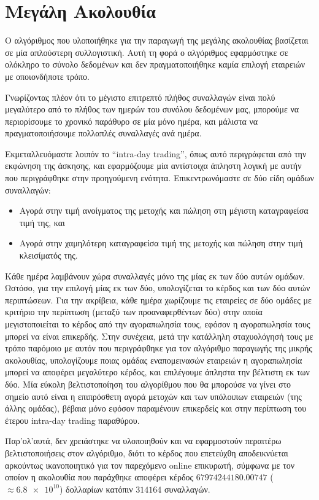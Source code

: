 \section{Μεγάλη Ακολουθία}

Ο αλγόριθμος που υλοποιήθηκε για την παραγωγή της μεγάλης ακολουθίας βασίζεται σε μία απλούστερη συλλογιστική.
Αυτή τη φορά ο αλγόριθμος εφαρμόστηκε σε ολόκληρο το σύνολο δεδομένων και δεν πραγματοποιήθηκε καμία επιλογή εταιρειών με οποιονδήποτε τρόπο.

Γνωρίζοντας πλέον ότι το μέγιστο επιτρεπτό πλήθος συναλλαγών είναι πολύ μεγαλύτερο από το πλήθος των ημερών του συνόλου δεδομένων μας, μπορούμε να περιορίσουμε το χρονικό παράθυρο σε μία μόνο ημέρα, και μάλιστα να πραγματοποιήσουμε πολλαπλές συναλλαγές ανά ημέρα.

Εκμεταλλευόμαστε λοιπόν το ``intra-day trading'', όπως αυτό περιγράφεται από την εκφώνηση της άσκησης, και εφαρμόζουμε μία αντίστοιχα άπληστη λογική με αυτήν που περιγράφθηκε στην προηγούμενη ενότητα.
Επικεντρωνόμαστε σε δύο είδη ομάδων συναλλαγών:
\begin{itemize}
    \item Αγορά στην τιμή ανοίγματος της μετοχής και πώληση στη μέγιστη καταγραφείσα τιμή της, και
    \item Αγορά στην χαμηλότερη καταγραφείσα τιμή της μετοχής και πώληση στην τιμή κλεισίματός της.
\end{itemize}

Κάθε ημέρα λαμβάνουν χώρα συναλλαγές μόνο της μίας εκ των δύο αυτών ομάδων.
Ωστόσο, για την επιλογή μίας εκ των δύο, υπολογίζεται το κέρδος και των δύο αυτών περιπτώσεων.
Για την ακρίβεια, κάθε ημέρα χωρίζουμε τις εταιρείες σε δύο ομάδες με κριτήριο την περίπτωση (μεταξύ των προαναφερθέντων δύο) στην οποία μεγιστοποιείται το κέρδος από την αγοραπωλησία τους, εφόσον η αγοραπωλησία τους μπορεί να είναι επικερδής.
Στην συνέχεια, μετά την κατάλληλη σταχυολόγησή τους με τρόπο παρόμοιο με αυτόν που περιγράφθηκε για τον αλγόριθμο παραγωγής της μικρής ακολουθίας, υπολογίζουμε ποιας ομάδας εναπομεινασών εταιρειών η αγοραπωλησία μπορεί να αποφέρει μεγαλύτερο κέρδος, και επιλέγουμε άπληστα την βέλτιστη εκ των δύο.
Μία εύκολη βελτιστοποίηση του αλγορίθμου που θα μπορούσε να γίνει στο σημείο αυτό είναι η επιπρόσθετη αγορά μετοχών και των υπόλοιπων εταιρειών (της άλλης ομάδας), βέβαια μόνο εφόσον παραμένουν επικερδείς και στην περίπτωση του έτερου intra-day trading παραθύρου.

Παρ'ολ'αυτά, δεν χρειάστηκε να υλοποιηθούν και να εφαρμοστούν περαιτέρω βελτιστοποιήσεις στον αλγόριθμο, διότι το κέρδος που επετεύχθη αποδεικνύεται αρκούντως ικανοποιητικό για τον παρεχόμενο online επικυρωτή, σύμφωνα με τον οποίον η ακολουθία που παράχθηκε αποφέρει κέρδος $67974244180.00747$ ($\approx \num{6.8e10}$) δολλαρίων κατόπιν $314164$ συναλλαγών.

